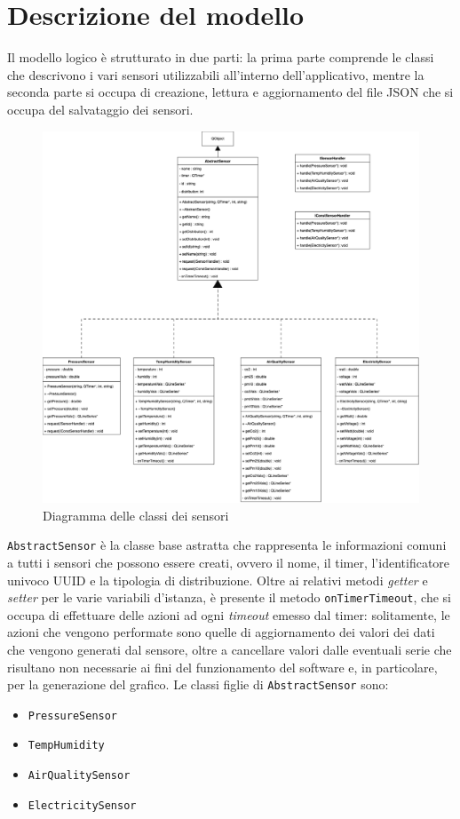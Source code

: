 \documentclass[a4paper, 10pt]{article}
\begin{document}
    \section{Descrizione del modello}
    Il modello logico è strutturato in due parti: la prima parte comprende le classi che descrivono i vari sensori utilizzabili all'interno dell'applicativo, mentre la seconda parte si occupa di creazione, lettura e aggiornamento del file JSON che si occupa del salvataggio dei sensori.
    \begin{figure}[H]
        \centering
        \includegraphics[scale=0.3]{assets/UML.png}
        \caption{Diagramma delle classi dei sensori}
    \end{figure}
    \texttt{AbstractSensor} è la classe base astratta che rappresenta le informazioni comuni a tutti i sensori che possono essere creati, ovvero il nome, il timer, l'identificatore univoco UUID e la tipologia di distribuzione. Oltre ai relativi metodi \emph{getter} e \emph{setter} per le varie variabili d'istanza, 
    è presente il metodo \texttt{onTimerTimeout}, che si occupa di effettuare delle azioni ad ogni \emph{timeout} emesso dal timer: solitamente, le azioni che vengono performate sono quelle di aggiornamento dei valori dei dati che vengono generati dal sensore, oltre a cancellare valori dalle eventuali serie che risultano non necessarie ai fini del funzionamento del software e, in particolare, per la generazione del grafico. Le classi figlie di \texttt{AbstractSensor} sono:
    \begin{itemize}
        \item \texttt{PressureSensor}
        \item \texttt{TempHumidity}
        \item \texttt{AirQualitySensor}
        \item \texttt{ElectricitySensor}
    \end{itemize}
\end{document}
